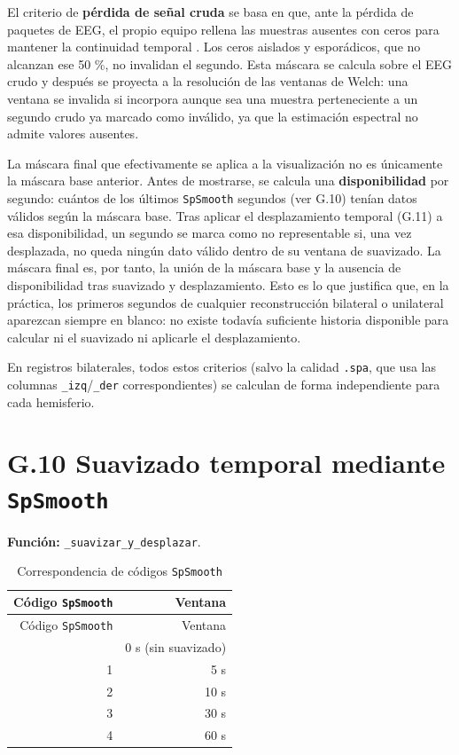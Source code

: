 \documentclass[
  spanish,
  a4paper,
  12pt,
  twoside]{memoir}
\begin{document}
El criterio de \textbf{pérdida de señal cruda} se basa en que, ante la
pérdida de paquetes de EEG, el propio equipo rellena las muestras
ausentes con ceros para mantener la continuidad temporal
\citep{CovidienSerial2010}. Los ceros aislados y esporádicos, que no
alcanzan ese 50 \%, no invalidan el segundo. Esta máscara se calcula
sobre el EEG crudo y después se proyecta a la resolución de las ventanas
de Welch: una ventana se invalida si incorpora aunque sea una muestra
perteneciente a un segundo crudo ya marcado como inválido, ya que la
estimación espectral no admite valores ausentes.

La máscara final que efectivamente se aplica a la visualización no es
únicamente la máscara base anterior. Antes de mostrarse, se calcula una
\textbf{disponibilidad} por segundo: cuántos de los últimos
\texttt{SpSmooth} segundos (ver G.10) tenían datos válidos según la
máscara base. Tras aplicar el desplazamiento temporal (G.11) a esa
disponibilidad, un segundo se marca como no representable si, una vez
desplazada, no queda ningún dato válido dentro de su ventana de
suavizado. La máscara final es, por tanto, la unión de la máscara base y
la ausencia de disponibilidad tras suavizado y desplazamiento. Esto es
lo que justifica que, en la práctica, los primeros segundos de cualquier
reconstrucción bilateral o unilateral aparezcan siempre en blanco: no
existe todavía suficiente historia disponible para calcular ni el
suavizado ni aplicarle el desplazamiento.

En registros bilaterales, todos estos criterios (salvo la calidad
\texttt{.spa}, que usa las columnas \texttt{\_izq}/\texttt{\_der}
correspondientes) se calculan de forma independiente para cada
hemisferio.

\chapter{\texorpdfstring{G.10 Suavizado temporal mediante
\texttt{SpSmooth}}{G.10 Suavizado temporal mediante SpSmooth}}\label{g.10-suavizado-temporal-mediante-spsmooth}

\textbf{Función:} \texttt{\_suavizar\_y\_desplazar}.

\begin{longtable}[]{@{}rr@{}}
\caption{Correspondencia de códigos
\protect\texttt{SpSmooth}}\label{tbl-spsmooth-anexo}\tabularnewline
\toprule\noalign{}
Código \texttt{SpSmooth} & Ventana \\
\midrule\noalign{}
\endfirsthead
\toprule\noalign{}
Código \texttt{SpSmooth} & Ventana \\
\midrule\noalign{}
\endhead
\bottomrule\noalign{}
\endlastfoot
0 & 0 s (sin suavizado) \\
1 & 5 s \\
2 & 10 s \\
3 & 30 s \\
4 & 60 s \\
\end{longtable}
\end{document}

